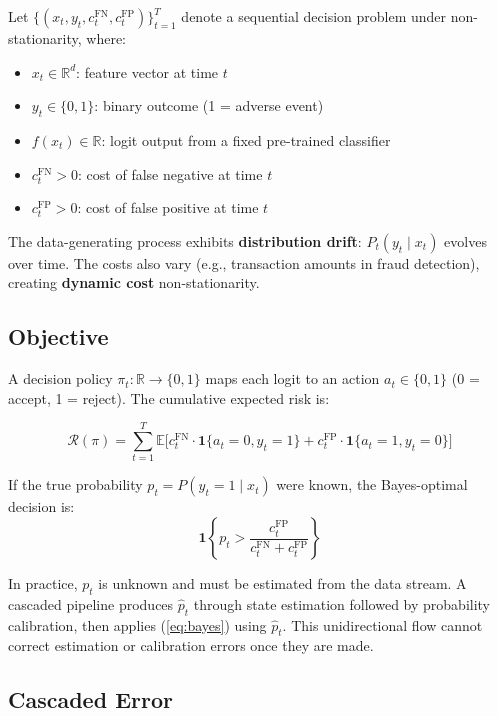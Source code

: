 \documentclass[12pt,a4paper]{article}
\newcommand{\R}{\mathbb{R}}
\newcommand{\E}{\mathbb{E}}
\begin{document}
Let $\{(x_t, y_t, c^{\text{FN}}_t, c^{\text{FP}}_t)\}_{t=1}^T$ denote a sequential decision problem under non-stationarity, where:

\begin{itemize}
    \item $x_t \in \R^d$: feature vector at time $t$
    \item $y_t \in \{0,1\}$: binary outcome (1 = adverse event)
    \item $f(x_t) \in \R$: logit output from a fixed pre-trained classifier
    \item $c^{\text{FN}}_t > 0$: cost of false negative at time $t$
    \item $c^{\text{FP}}_t > 0$: cost of false positive at time $t$
\end{itemize}

The data-generating process exhibits \textbf{distribution drift}: $P_t(y_t \mid x_t)$ evolves over time. The costs also vary (e.g., transaction amounts in fraud detection), creating \textbf{dynamic cost} non-stationarity.

\subsection{Objective}

A decision policy $\pi_t: \R \to \{0,1\}$ maps each logit to an action $a_t \in \{0,1\}$ (0 = accept, 1 = reject). The cumulative expected risk is:

\begin{equation}
    \mathcal{R}(\pi) = \sum_{t=1}^T \E\Big[ c^{\text{FN}}_t \cdot \mathbf{1}\{a_t=0, y_t=1\} + c^{\text{FP}}_t \cdot \mathbf{1}\{a_t=1, y_t=0\} \Big] \label{eq:risk}
\end{equation}

If the true probability $p_t = P(y_t=1 \mid x_t)$ were known, the Bayes-optimal decision is:
\begin{equation}
     \mathbf{1}\left\{ p_t > \frac{c^{\text{FP}}_t}{c^{\text{FN}}_t + c^{\text{FP}}_t} \right\} \label{eq:bayes}
\end{equation}

In practice, $p_t$ is unknown and must be estimated from the data stream. A cascaded pipeline produces $\hat{p}_t$ through state estimation followed by probability calibration, then applies (\ref{eq:bayes}) using $\hat{p}_t$. This unidirectional flow cannot correct estimation or calibration errors once they are made.

\subsection{Cascaded Error}
\end{document}
